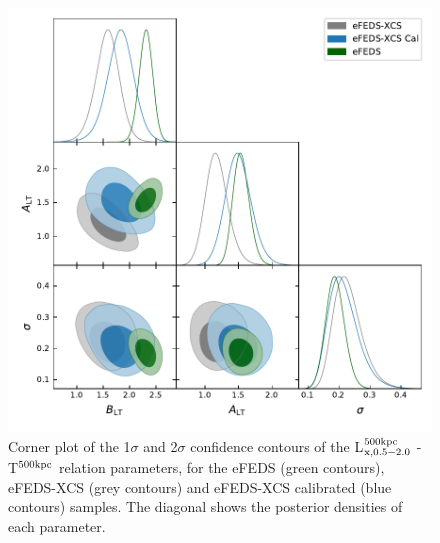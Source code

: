\documentclass[fleqn,usenatbib]{mnras}
\begin{document}
\begin{figure}
    \centering
    \includegraphics[width=1\columnwidth]{images/lt52_corner.pdf}
    \caption[]{Corner plot of the 1$\sigma$ and 2$\sigma$ confidence contours of the L$^{500\rm{kpc}}_{\rm{x, 0.5-2.0}}$ - T$^{500\rm{kpc}}$ relation parameters, for the eFEDS (green contours), eFEDS-XCS (grey contours) and eFEDS-XCS calibrated (blue contours) samples.  The diagonal shows the posterior densities of each parameter.}
    \label{fig:ltcorner}
\end{figure}
\end{document}
